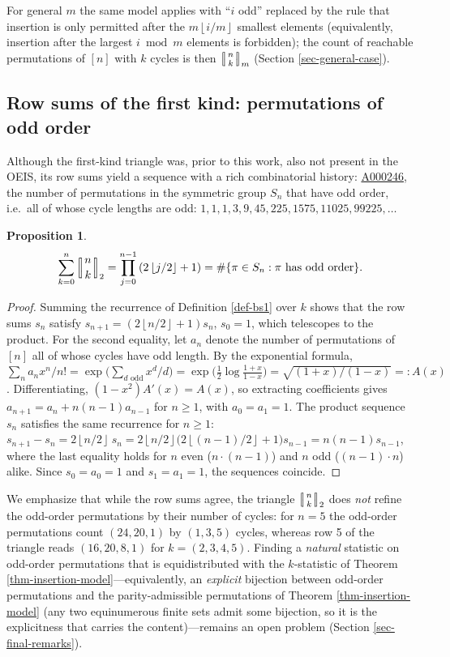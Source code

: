 \documentclass[a4paper]{amsart}
\numberwithin{equation}{section}
\newcommand{\mStirlingone}[2]{\left[\mkern-3.8mu\middle|\genfrac{}{}{0pt}{}{#1}{#2}\middle|\mkern-3.8mu\right]}
\newcommand{\floor}[1]{\left\lfloor #1 \right\rfloor}
\newtheorem{proposition}[theorem]{Proposition}
\begin{document}
For general $m$ the same model applies with ``$i$ odd'' replaced by the rule that insertion is only permitted after the $m\floor{i/m}$ smallest elements (equivalently, insertion after the largest $i \bmod m$ elements is forbidden); the count of reachable permutations of $[n]$ with $k$ cycles is then $\mStirlingone{n}{k}_m$ (Section \ref{sec-general-case}).

\subsection{Row sums of the first kind: permutations of odd order}

Although the first-kind triangle was, prior to this work, also not present in the OEIS, its row sums yield a sequence with a rich combinatorial history: \href{https://oeis.org/A000246}{A000246}, the number of permutations in the symmetric group $S_n$ that have odd order, i.e.\ all of whose cycle lengths are odd: $1, 1, 1, 3, 9, 45, 225, 1575, 11025, 99225, \ldots$

\begin{proposition}\label{prop-a000246}
\[
\sum_{k=0}^{n}\mStirlingone{n}{k}_2 = \prod_{j=0}^{n-1}\left(2\floor{j/2}+1\right) = \#\{\pi \in S_n : \pi \text{ has odd order}\}.
\]
\end{proposition}
\begin{proof}
Summing the recurrence of Definition \ref{def-bs1} over $k$ shows that the row sums $s_n$ satisfy $s_{n+1} = (2\floor{n/2}+1)s_n$, $s_0 = 1$, which telescopes to the product. For the second equality, let $a_n$ denote the number of permutations of $[n]$ all of whose cycles have odd length. By the exponential formula, $\sum_n a_n x^n/n! = \exp\big(\sum_{d \text{ odd}} x^d/d\big) = \exp\big(\tfrac{1}{2}\log\tfrac{1+x}{1-x}\big) = \sqrt{(1+x)/(1-x)} =: A(x)$. Differentiating, $(1-x^2)A'(x) = A(x)$, so extracting coefficients gives $a_{n+1} = a_n + n(n-1)a_{n-1}$ for $n \geq 1$, with $a_0 = a_1 = 1$. The product sequence $s_n$ satisfies the same recurrence for $n \geq 1$: $s_{n+1} - s_n = 2\floor{n/2}\,s_n = 2\floor{n/2}\big(2\floor{(n-1)/2}+1\big)s_{n-1} = n(n-1)s_{n-1}$, where the last equality holds for $n$ even ($n \cdot (n-1)$) and $n$ odd ($(n-1)\cdot n$) alike. Since $s_0 = a_0 = 1$ and $s_1 = a_1 = 1$, the sequences coincide.
\end{proof}

We emphasize that while the row sums agree, the triangle $\mStirlingone{n}{k}_2$ does \emph{not} refine the odd-order permutations by their number of cycles: for $n = 5$ the odd-order permutations count $(24, 20, 1)$ by $(1, 3, 5)$ cycles, whereas row 5 of the triangle reads $(16, 20, 8, 1)$ for $k = (2,3,4,5)$. Finding a \emph{natural} statistic on odd-order permutations that is equidistributed with the $k$-statistic of Theorem \ref{thm-insertion-model}---equivalently, an \emph{explicit} bijection between odd-order permutations and the parity-admissible permutations of Theorem \ref{thm-insertion-model} (any two equinumerous finite sets admit some bijection, so it is the explicitness that carries the content)---remains an open problem (Section \ref{sec-final-remarks}).
\end{document}
